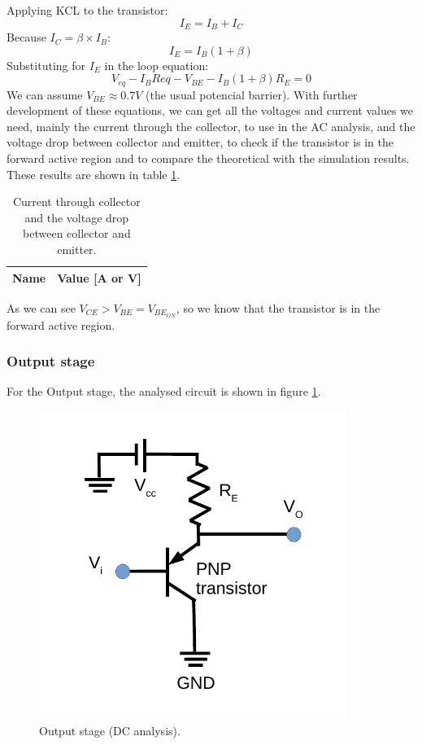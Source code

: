 Applying KCL to the transistor:
\begin{equation}
    I_{E}=I_{B}+I_{C}
\end{equation}
Because $I_{C}=\beta \times I_{B}$:
\begin{equation}
    I_{E}=I_{B}\left( 1+\beta \right)
\end{equation}
Substituting for $I_{E}$ in the loop equation:
\begin{equation}
    V_{eq}-I_{B}Req-V_{BE}-I_{B}\left( 1+\beta \right) R_{E}=0
\end{equation}
We can assume $V_{BE}\approx 0.7V$ (the usual potencial barrier).
With further development of these equations, we can get all the voltages and current values we need, mainly the current through the collector, 
to use in the AC analysis, and the voltage drop between collector and emitter, to check if the transistor is in the forward active region and to compare the 
theoretical with the simulation results. 
These results are shown in table \ref{tab:op1_tab}.

\begin{table}[h]
    \centering
    \begin{tabular}{|l|r|}
      \hline
      {\bf Name} & {\bf Value [A or V]} \\ \hline
      
    \end{tabular}
    \caption{Current through collector and the voltage drop between collector and emitter.}
    \label{tab:op1_tab}
  \end{table}


As we can see $V_{CE} > V_{BE}=V_{BE_{ON}}$, so we know that the transistor is in the forward active region.

\subsubsection{Output stage}
For the Output stage, the analysed circuit is shown in figure \ref{fig:Thevenin2}.

\begin{figure}[H]
  \begin{center}
   \includegraphics[width=10cm]{lab4_DC2.pdf}
  \caption{Output stage (DC analysis).}
  \label{fig:Thevenin2}
  \end{center}
  \end{figure}

